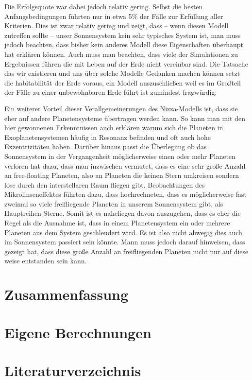 \documentclass[12pt,a4paper,twoside]{article}
\renewcommand{\cite}{\citep}
\begin{document}
Die Erfolgsquote war dabei jedoch relativ gering. Selbst die besten Anfangsbedingungen führten nur in etwa 5\% der Fälle zur Erfüllung aller Kriterien\cite{Nesvorny2012}. Dies ist zwar relativ gering und zeigt, dass -- wenn diesen Modell zutreffen sollte -- unser Sonnensystem kein sehr typisches System ist, man muss jedoch beachten, dass bisher kein anderes Modell diese Eigenschaften überhaupt hat erklären können.
Auch muss man beachten, dass viele der Simulationen zu Ergebnissen führen die mit Leben auf der Erde nicht vereinbar sind. Die Tatsache das wir existieren und uns über solche Modelle Gedanken machen können setzt die habitabilität der Erde voraus, ein Modell auszuschließen weil es im Großteil der Fälle zu einer unbewohnbaren Erde führt ist zumindest fragwürdig\cite{Brasser2009}.

Ein weiterer Vorteil dieser Verallgemeinerungen des Nizza-Modells ist, dass sie eher auf andere Planetensysteme übertragen werden kann. So kann man mit den hier gewonnenen Erkenntnissen auch erklären warum sich die Planeten in Exoplanetensystemen häufig in Resonanz befinden und oft auch hohe Exzentrizitäten haben\cite{Weidenschilling1996,Rasio1996,Marcy2001,Nesvorny2012}.
Darüber hinaus passt die Überlegung ob das Sonnensystem in der Vergangenheit möglicherweise einen oder mehr Planeten verloren hat dazu, dass man inzwischen vermutet, dass es eine sehr große Anzahl an free-floating Planeten, also an Planeten die keinen Stern umkreisen sondern lose durch den interstellaren Raum fliegen gibt. %
Beobachtungen des Mikrolinseneffektes führten dazu, dass \cite{Sumi2011} hochrechneten, dass es möglicherweise fast zweimal so viele freifliegende Planeten in unserem Sonnensystem gibt, als Hauptreihen-Sterne. %
Somit ist es naheliegen davon auszugehen, dass es eher die Regel als die Ausnahme ist, dass in einem Planetensystem ein oder mehrere Planeten aus dem System geschleudert wird. Es ist also nicht abwegig dies auch im Sonnensystem passiert sein könnte.
Mann muss jedoch darauf hinweisen, dass \cite{Veras2012} gezeigt hat, dass diese große Anzahl an freifliegenden Planeten nicht nur auf diese weise entstanden sein kann.

\section{Zusammenfassung}


\newpage
\renewcommand{\thesection}{\Alph{section}}
\setcounter{section}{0} %
\section{Eigene Berechnungen}
\section{Literaturverzeichnis}

{}
\end{document}
